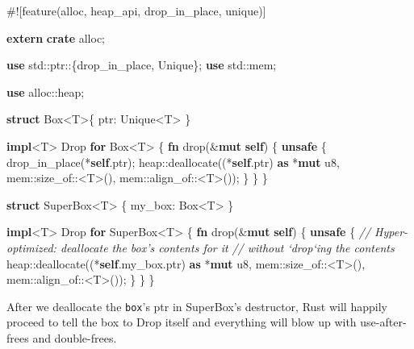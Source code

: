 \documentclass[a4paper,]{book}
\newenvironment{Shaded}{\begin{snugshade}}{\end{snugshade}}
\newcommand{\KeywordTok}[1]{\textcolor[rgb]{0.13,0.29,0.53}{\textbf{{#1}}}}
\newcommand{\DataTypeTok}[1]{\textcolor[rgb]{0.13,0.29,0.53}{{#1}}}
\newcommand{\CommentTok}[1]{\textcolor[rgb]{0.56,0.35,0.01}{\textit{{#1}}}}
\newcommand{\BuiltInTok}[1]{{#1}}
\newcommand{\AttributeTok}[1]{\textcolor[rgb]{0.77,0.63,0.00}{{#1}}}
\newcommand{\NormalTok}[1]{{#1}}
\begin{document}
\begin{Shaded}
\begin{Highlighting}[]
\AttributeTok{#![}\NormalTok{feature}\AttributeTok{(}\NormalTok{alloc}\AttributeTok{,} \NormalTok{heap_api}\AttributeTok{,} \NormalTok{drop_in_place}\AttributeTok{,} \NormalTok{unique}\AttributeTok{)]}

\KeywordTok{extern} \KeywordTok{crate} \NormalTok{alloc;}

\KeywordTok{use} \NormalTok{std::ptr::\{drop_in_place, Unique\};}
\KeywordTok{use} \NormalTok{std::mem;}

\KeywordTok{use} \NormalTok{alloc::heap;}

\KeywordTok{struct} \DataTypeTok{Box}\NormalTok{<T>\{ ptr: Unique<T> \}}

\KeywordTok{impl}\NormalTok{<T> }\BuiltInTok{Drop} \KeywordTok{for} \DataTypeTok{Box}\NormalTok{<T> \{}
    \KeywordTok{fn} \NormalTok{drop(&}\KeywordTok{mut} \KeywordTok{self}\NormalTok{) \{}
        \KeywordTok{unsafe} \NormalTok{\{}
            \NormalTok{drop_in_place(*}\KeywordTok{self}\NormalTok{.ptr);}
            \NormalTok{heap::deallocate((*}\KeywordTok{self}\NormalTok{.ptr) }\KeywordTok{as} \NormalTok{*}\KeywordTok{mut} \DataTypeTok{u8}\NormalTok{,}
                             \NormalTok{mem::size_of::<T>(),}
                             \NormalTok{mem::align_of::<T>());}
        \NormalTok{\}}
    \NormalTok{\}}
\NormalTok{\}}

\KeywordTok{struct} \NormalTok{SuperBox<T> \{ my_box: }\DataTypeTok{Box}\NormalTok{<T> \}}

\KeywordTok{impl}\NormalTok{<T> }\BuiltInTok{Drop} \KeywordTok{for} \NormalTok{SuperBox<T> \{}
    \KeywordTok{fn} \NormalTok{drop(&}\KeywordTok{mut} \KeywordTok{self}\NormalTok{) \{}
        \KeywordTok{unsafe} \NormalTok{\{}
            \CommentTok{// Hyper-optimized: deallocate the box's contents for it}
            \CommentTok{// without `drop`ing the contents}
            \NormalTok{heap::deallocate((*}\KeywordTok{self}\NormalTok{.my_box.ptr) }\KeywordTok{as} \NormalTok{*}\KeywordTok{mut} \DataTypeTok{u8}\NormalTok{,}
                             \NormalTok{mem::size_of::<T>(),}
                             \NormalTok{mem::align_of::<T>());}
        \NormalTok{\}}
    \NormalTok{\}}
\NormalTok{\}}
\end{Highlighting}
\end{Shaded}

After we deallocate the \texttt{box}'s ptr in SuperBox's destructor,
Rust will happily proceed to tell the box to Drop itself and everything
will blow up with use-after-frees and double-frees.
\end{document}
